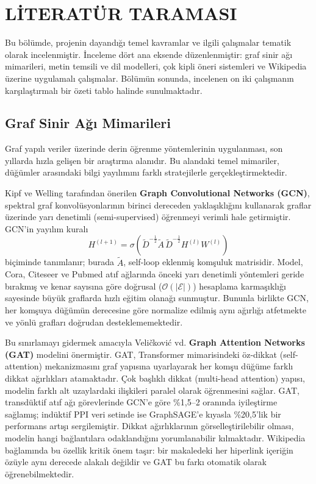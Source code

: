 \chapter{LİTERATÜR TARAMASI}
\thispagestyle{empty}

Bu bölümde, projenin dayandığı temel kavramlar ve ilgili çalışmalar tematik olarak incelenmiştir. İnceleme dört ana eksende düzenlenmiştir: graf sinir ağı mimarileri, metin temsili ve dil modelleri, çok kipli öneri sistemleri ve Wikipedia üzerine uygulamalı çalışmalar. Bölümün sonunda, incelenen on iki çalışmanın karşılaştırmalı bir özeti tablo halinde sunulmaktadır.

\section{Graf Sinir Ağı Mimarileri}

Graf yapılı veriler üzerinde derin öğrenme yöntemlerinin uygulanması, son yıllarda hızla gelişen bir araştırma alanıdır. Bu alandaki temel mimariler, düğümler arasındaki bilgi yayılımını farklı stratejilerle gerçekleştirmektedir.

Kipf ve Welling \cite{kipf2017semi} tarafından önerilen \textbf{Graph Convolutional Networks (GCN)}, spektral graf konvolüsyonlarının birinci dereceden yaklaşıklığını kullanarak graflar üzerinde yarı denetimli (semi-supervised) öğrenmeyi verimli hale getirmiştir. GCN'in yayılım kuralı
\[
    H^{(l+1)} = \sigma\!\left(\tilde{D}^{-\frac{1}{2}}\tilde{A}\,\tilde{D}^{-\frac{1}{2}}H^{(l)}W^{(l)}\right)
\]
biçiminde tanımlanır; burada $\tilde{A}$, self-loop eklenmiş komşuluk matrisidir. Model, Cora, Citeseer ve Pubmed atıf ağlarında önceki yarı denetimli yöntemleri geride bırakmış ve kenar sayısına göre doğrusal ($\mathcal{O}(|\mathcal{E}|)$) hesaplama karmaşıklığı sayesinde büyük graflarda hızlı eğitim olanağı sunmuştur. Bununla birlikte GCN, her komşuya düğümün derecesine göre normalize edilmiş aynı ağırlığı atfetmekte ve yönlü grafları doğrudan desteklememektedir.

Bu sınırlamayı gidermek amacıyla Veličković vd.\@ \cite{velickovic2018graph} \textbf{Graph Attention Networks (GAT)} modelini önermiştir. GAT, Transformer mimarisindeki öz-dikkat (self-attention) mekanizmasını graf yapısına uyarlayarak her komşu düğüme farklı dikkat ağırlıkları atamaktadır. Çok başlıklı dikkat (multi-head attention) yapısı, modelin farklı alt uzaylardaki ilişkileri paralel olarak öğrenmesini sağlar. GAT, transdüktif atıf ağı görevlerinde GCN'e göre \%1,5--2 oranında iyileştirme sağlamış; indüktif PPI veri setinde ise GraphSAGE'e kıyasla \%20,5'lik bir performans artışı sergilemiştir. Dikkat ağırlıklarının görselleştirilebilir olması, modelin hangi bağlantılara odaklandığını yorumlanabilir kılmaktadır. Wikipedia bağlamında bu özellik kritik önem taşır: bir makaledeki her hiperlink içeriğin özüyle aynı derecede alakalı değildir ve GAT bu farkı otomatik olarak öğrenebilmektedir.

